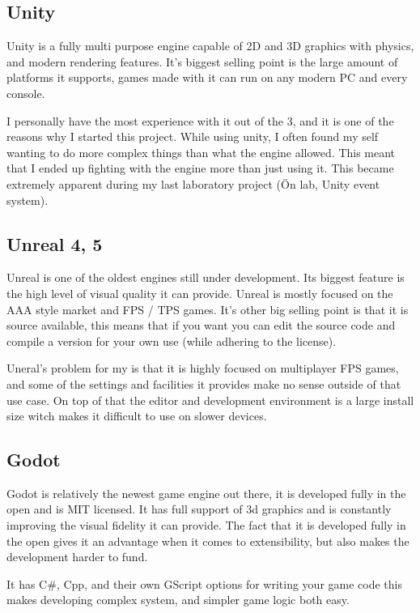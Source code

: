 \subsection{Unity}

Unity is a fully multi purpose engine capable of 2D and 3D graphics with physics, and modern rendering features. It's biggest selling point is the large amount of platforms it supports, games made with it can run on any modern PC and every console.

I personally have the most experience with it out of the 3, and it is one of the reasons why I started this project. While using unity, I often found my self wanting to do more complex things than what the engine allowed. This meant that I ended up fighting with the engine more than just using it. This became extremely apparent during my last laboratory project (Ön lab, Unity event system).

\subsection{Unreal 4, 5}

Unreal is one of the oldest engines still under development. Its biggest feature is the high level of visual quality it can provide. Unreal is mostly focused on the AAA style market and FPS / TPS games. It's other big selling point is that it is source available, this means that if you want you can edit the source code and compile a version for your own use (while adhering to the license).

Uneral's problem for my is that it is highly focused on multiplayer FPS games, and some of the settings and facilities it provides make no sense outside of that use case. On top of that the editor and development environment is a large install size witch makes it difficult to use on slower devices.

\subsection{Godot}

Godot is relatively the newest game engine out there, it is developed fully in the open and is MIT licensed. It has full support of 3d graphics and is constantly improving the visual fidelity it can provide. The fact that it is developed fully in the open gives it an advantage when it comes to extensibility, but also makes the development harder to fund.

It has C\#, Cpp, and their own GScript options for writing your game code this makes developing complex system, and simpler game logic both easy.

